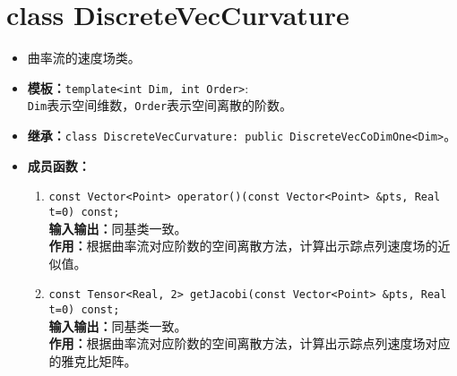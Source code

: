 \documentclass[a4paper,twoside]{ctexart}
\begin{document}
\section{class DiscreteVecCurvature}
\begin{itemize}
    \item 曲率流的速度场类。
    \item \textbf{模板：}\texttt{template<int Dim, int Order>}:\\
    \texttt{Dim}表示空间维数，\texttt{Order}表示空间离散的阶数。
    \item \textbf{继承：}\texttt{class DiscreteVecCurvature: public DiscreteVecCoDimOne<Dim>}。
    \item \textbf{成员函数：}
        \begin{enumerate}[(1)]
            \item \texttt{const Vector<Point> operator()(const Vector<Point> \&pts, Real t=0) const;}\\
            \textbf{输入输出：}同基类一致。\\
            \textbf{作用：}根据曲率流对应阶数的空间离散方法，计算出示踪点列速度场的近似值。
            \item \texttt{const Tensor<Real, 2> getJacobi(const Vector<Point> \&pts, Real t=0) const;}\\
            \textbf{输入输出：}同基类一致。\\
            \textbf{作用：}根据曲率流对应阶数的空间离散方法，计算出示踪点列速度场对应的雅克比矩阵。
        \end{enumerate}
\end{itemize}
\end{document}
